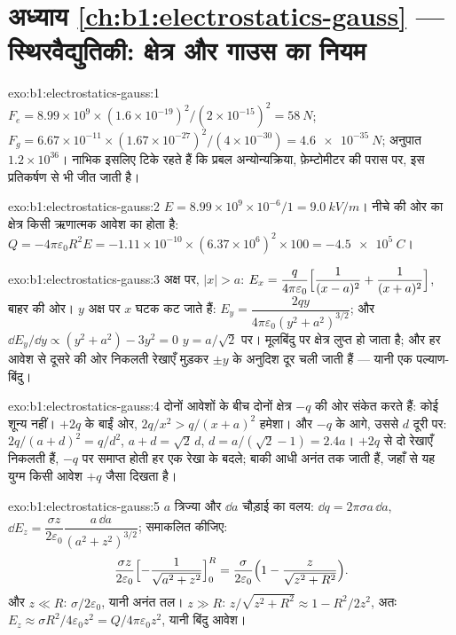 \section*{अध्याय \ref{ch:b1:electrostatics-gauss} --- स्थिरवैद्युतिकी: क्षेत्र और गाउस का नियम}

\begin{solution}{exo:b1:electrostatics-gauss:1}
$F_e = 8.99 \times 10^9 \times (1.6 \times 10^{-19})^2/(2 \times 10^{-15})^2 = \qty{58}{N}$;
$F_g = 6.67 \times 10^{-11} \times (1.67 \times 10^{-27})^2/(4 \times 10^{-30}) =
\qty{4.6e-35}{N}$; अनुपात $1.2 \times 10^{36}$। नाभिक इसलिए टिके रहते हैं कि
प्रबल अन्योन्यक्रिया, फ़ेम्टोमीटर की परास पर, इस प्रतिकर्षण से भी जीत जाती है।
\end{solution}

\begin{solution}{exo:b1:electrostatics-gauss:2}
$E = 8.99 \times 10^9 \times 10^{-6}/1 = \qty{9.0}{kV/m}$। नीचे की ओर का क्षेत्र
किसी ऋणात्मक आवेश का होता है: $Q = -4\pi\varepsilon_0R^2E = -1.11 \times 10^{-10} \times
(6.37 \times 10^6)^2 \times 100 = \qty{-4.5e5}{C}$।
\end{solution}

\begin{solution}{exo:b1:electrostatics-gauss:3}
अक्ष पर, $|x| > a$: $E_x = \dfrac{q}{4\pi\varepsilon_0}\Bigl[\dfrac{1}{(x - a)^2} +
\dfrac{1}{(x + a)^2}\Bigr]$, बाहर की ओर। $y$ अक्ष पर $x$ घटक
कट जाते हैं: $E_y = \dfrac{2qy}{4\pi\varepsilon_0(y^2 + a^2)^{3/2}}$; और $\dd E_y/\dd y \propto
(y^2 + a^2) - 3y^2 = 0$ $y = a/\sqrt2$ पर। मूलबिंदु पर क्षेत्र लुप्त हो
जाता है; और हर आवेश से दूसरे की ओर निकलती रेखाएँ मुड़कर
$\pm y$ के अनुदिश दूर चली जाती हैं --- यानी एक पल्याण-बिंदु।
\end{solution}

\begin{solution}{exo:b1:electrostatics-gauss:4}
दोनों आवेशों के बीच दोनों क्षेत्र $-q$ की ओर संकेत करते हैं: कोई शून्य नहीं।
$+2q$ के बाईं ओर, $2q/x^2 > q/(x + a)^2$ हमेशा। और $-q$ के आगे, उससे
$d$ दूरी पर: $2q/(a + d)^2 = q/d^2$, $a + d = \sqrt2\,d$, $d = a/(\sqrt2 - 1) = 2.4a$।
$+2q$ से दो रेखाएँ निकलती हैं, $-q$ पर समाप्त होती हर एक रेखा के बदले; बाकी
आधी अनंत तक जाती हैं, जहाँ से यह युग्म किसी आवेश $+q$ जैसा दिखता है।
\end{solution}

\begin{solution}{exo:b1:electrostatics-gauss:5}
$a$ त्रिज्या और $\dd a$ चौड़ाई का वलय: $\dd q = 2\pi\sigma a\,\dd a$, $\dd E_z =
\dfrac{\sigma z}{2\varepsilon_0}\dfrac{a\,\dd a}{(a^2 + z^2)^{3/2}}$; समाकलित कीजिए:
\[
\dfrac{\sigma z}{2\varepsilon_0}\Bigl[-\dfrac{1}{\sqrt{a^2 + z^2}}\Bigr]_0^R
= \dfrac{\sigma}{2\varepsilon_0}\Bigl(1 - \dfrac{z}{\sqrt{z^2 + R^2}}\Bigr) .
\]
और $z \ll R$: $\sigma/2\varepsilon_0$, यानी
अनंत तल। $z \gg R$: $z/\sqrt{z^2 + R^2} \approx 1 - R^2/2z^2$, अतः $E_z
\approx \sigma R^2/4\varepsilon_0z^2 = Q/4\pi\varepsilon_0z^2$, यानी बिंदु आवेश।
\end{solution}

